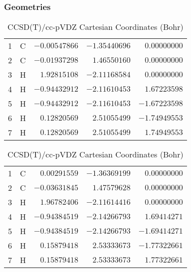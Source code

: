 \documentclass[10pt,oneside]{article}
\begin{document}
\clearpage

\subsection{}

\begin{table}[h!]
\subsubsection*{Geometries}
\begin{multicols}{2}
\centering
\caption{CCSD(T)/cc-pVTZ Cartesian Coordinates (Bohr)}
\begin{tabular}{llrrr}
\toprule
1  & C  & $-0.00547866$ & $-1.35440696$ & $ 0.00000000$ \\
2  & C  & $-0.01937298$ & $ 1.46550160$ & $ 0.00000000$ \\
3  & H  & $ 1.92815108$ & $-2.11168584$ & $ 0.00000000$ \\
4  & H  & $-0.94432912$ & $-2.11610453$ & $ 1.67223598$ \\
5  & H  & $-0.94432912$ & $-2.11610453$ & $-1.67223598$ \\
6  & H  & $ 0.12820569$ & $ 2.51055499$ & $-1.74949553$ \\
7  & H  & $ 0.12820569$ & $ 2.51055499$ & $ 1.74949553$ \\
\bottomrule
\end{tabular}
\caption{CCSD(T)/cc-pVDZ Cartesian Coordinates (Bohr)}
\begin{tabular}{llrrr}
\toprule
1  & C  & $ 0.00291559$ & $-1.36369199$ & $ 0.00000000$ \\
2  & C  & $-0.03631845$ & $ 1.47579628$ & $ 0.00000000$ \\
3  & H  & $ 1.96782406$ & $-2.11614416$ & $ 0.00000000$ \\
4  & H  & $-0.94384519$ & $-2.14266793$ & $ 1.69414271$ \\
5  & H  & $-0.94384519$ & $-2.14266793$ & $-1.69414271$ \\
6  & H  & $ 0.15879418$ & $ 2.53333673$ & $-1.77322661$ \\
7  & H  & $ 0.15879418$ & $ 2.53333673$ & $ 1.77322661$ \\
\bottomrule
\end{tabular}
\end{multicols}
\end{table}
\end{document}
